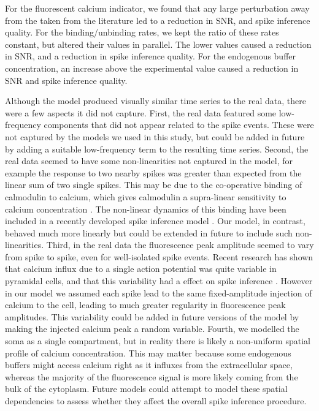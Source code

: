 For the fluorescent calcium indicator, we found that any large perturbation away from the taken from the literature led to a reduction in SNR, and spike inference quality. For the binding/unbinding rates, we kept the ratio of these rates constant, but altered their values in parallel. The lower values caused a reduction in SNR, and a reduction in spike inference quality. For the endogenous buffer concentration, an increase above the experimental value caused a reduction in SNR and spike inference quality.

Although the model produced visually similar time series to the real data, there were a few aspects it did not capture. First, the real data featured some low-frequency components that did not appear related to the spike events. These were not captured by the models we used in this study, but could be added in future by adding a suitable low-frequency term to the resulting time series. Second, the real data seemed to have some non-linearities not captured in the model, for example the response to two nearby spikes was greater than expected from the linear sum of two single spikes. This may be due to the co-operative binding of calmodulin to calcium, which gives calmodulin a supra-linear sensitivity to calcium concentration \parencite{faas}. The non-linear dynamics of this binding have been included in a recently developed spike inference model \parencite{greenberg}. Our model, in contrast, behaved much more linearly but could be extended in future to include such non-linearities. Third, in the real data the fluorescence peak amplitude seemed to vary from spike to spike, even for well-isolated spike events. Recent research has shown that calcium influx due to a single action potential was quite variable in pyramidal cells, and that this variability had a effect on spike inference \parencite{eltes}. However in our model we assumed each spike lead to the same fixed-amplitude injection of calcium to the cell, leading to much greater regularity in fluorescence peak amplitudes. This variability could be added in future versions of the model by making the injected calcium peak a random variable. Fourth, we modelled the soma as a single compartment, but in reality there is likely a non-uniform spatial profile of calcium concentration. This may matter because some endogenous buffers might access calcium right as it influxes from the extracellular space, whereas the majority of the fluorescence signal is more likely coming from the bulk of the cytoplasm. Future models could attempt to model these spatial dependencies to assess whether they affect the overall spike inference procedure.

